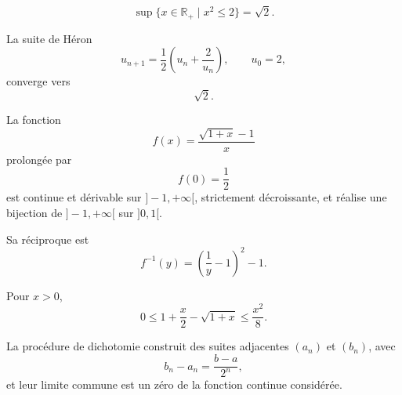 \documentclass[11pt,a4paper]{article}
\newcommand{\R}{\mathbb{R}}
\begin{document}
\[
\sup\{x\in\R_+ \mid x^2\leq2\}=\sqrt2.
\]

La suite de Héron
\[
u_{n+1}=\frac12\left(u_n+\frac2{u_n}\right),
\qquad u_0=2,
\]
converge vers
\[
\sqrt2.
\]

La fonction
\[
f(x)=\frac{\sqrt{1+x}-1}{x}
\]
prolongée par
\[
f(0)=\frac12
\]
est continue et dérivable sur \(]-1,+\infty[\), strictement décroissante, et réalise une bijection de \(]-1,+\infty[\) sur \(]0,1[\).

Sa réciproque est
\[
f^{-1}(y)=\left(\frac1y-1\right)^2-1.
\]

Pour \(x>0\),
\[
0\leq 1+\frac{x}{2}-\sqrt{1+x}\leq \frac{x^2}{8}.
\]

La procédure de dichotomie construit des suites adjacentes \((a_n)\) et \((b_n)\), avec
\[
b_n-a_n=\frac{b-a}{2^n},
\]
et leur limite commune est un zéro de la fonction continue considérée.
\end{document}
